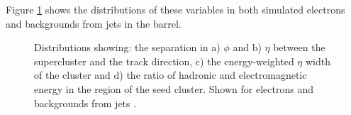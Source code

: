 Figure \ref{fig:electronID} shows the distributions of these variables in both simulated
electrons and backgrounds from jets in the barrel.

\begin{figure}
\begin{center}

\end{center}
\caption[Distributions of variables related to the electron supercluster in the
ECAL.]{
    Distributions showing: the separation in a) $\phi$ and b) $\eta$ between the supercluster and the
    track direction, c) the energy-weighted $\eta$ width of the cluster and d)
    the ratio of hadronic and electromagnetic energy in the region of the seed
    cluster. Shown for electrons and backgrounds from jets \cite{Baffioni:2006cd}. 
}
\label{fig:electronID}
\end{figure} 

